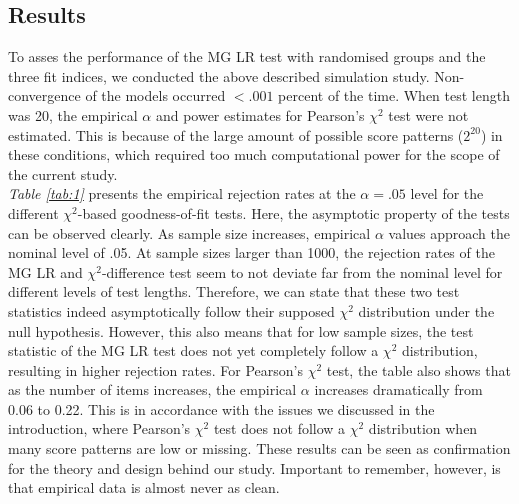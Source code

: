 \documentclass[Royal,sageapa,times,doublespace]{sagej}
\begin{document}
\subsection{Results}

To asses the performance of the MG LR test with randomised groups and the three fit indices, we conducted the above described simulation study. Non-convergence of the models occurred $<.001$ percent of the time. When test length was 20, the empirical $\alpha$ and power estimates for Pearson's $\chi^2$ test were not estimated. This is because of the large amount of possible score patterns ($2^{20}$) in these conditions, which required too much computational power for the scope of the current study. \\
\indent \textit{Table \ref{tab:1}} presents the empirical rejection rates at the $\alpha = .05$ level for the different $\chi^2$-based goodness-of-fit tests. Here, the asymptotic property of the tests can be observed clearly. As sample size increases, empirical $\alpha$ values approach the nominal level of .05. At sample sizes larger than 1000, the rejection rates of the MG LR and $\chi^2$-difference test seem to not deviate far from the nominal level for different levels of test lengths. Therefore, we can state that these two test statistics indeed asymptotically follow their supposed $\chi^2$ distribution under the null hypothesis. However, this also means that for low sample sizes, the test statistic of the MG LR test does not yet completely follow a $\chi^2$ distribution, resulting in higher rejection rates. For Pearson's $\chi^2$ test, the table also shows that as the number of items increases, the empirical $\alpha$ increases dramatically from 0.06 to 0.22. This is in accordance with the issues we discussed in the introduction, where Pearson's $\chi^2$ test does not follow a $\chi^2$ distribution when many score patterns are low or missing. These results can be seen as confirmation for the theory and design behind our study. Important to remember, however, is that empirical data is almost never as clean.
\end{document}
